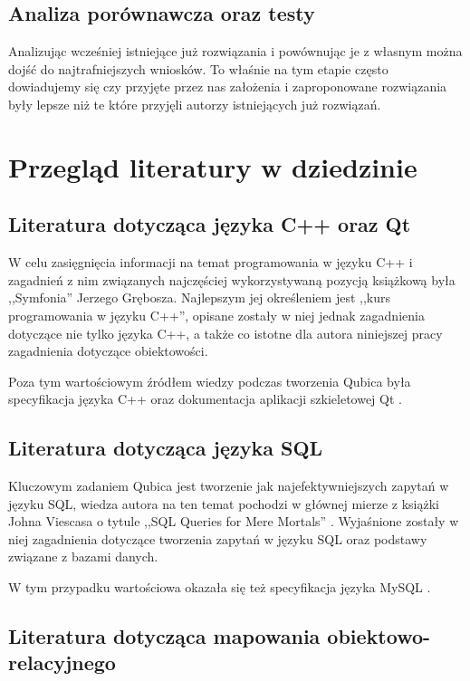 \documentclass[12pt]{report}
\begin{document}
\subsection{Analiza porównawcza oraz testy}

Analizując wcześniej istniejące już rozwiązania i powównując je z własnym można dojść do najtrafniejszych wniosków. To właśnie na tym etapie często dowiadujemy się czy
przyjęte przez nas założenia i zaproponowane rozwiązania były lepsze niż te które przyjęli autorzy istniejących już rozwiązań. 

\section{Przegląd literatury w dziedzinie}

\subsection{Literatura dotycząca języka C++ oraz Qt}

W celu zasięgnięcia informacji na temat programowania w języku C++ i zagadnień z nim związanych najczęściej wykorzystywaną pozycją książkową była ,,Symfonia'' 
\cite{symfonia} Jerzego Grębosza. Najlepszym jej określeniem jest ,,kurs programowania w języku C++'', opisane zostały w niej jednak zagadnienia dotyczące nie tylko języka 
C++, a także co istotne dla autora niniejszej pracy zagadnienia dotyczące obiektowości.

Poza tym wartościowym źródłem wiedzy podczas tworzenia Qubica była specyfikacja języka C++ \cite{cpp} oraz dokumentacja aplikacji szkieletowej Qt \cite{qt}.

\subsection{Literatura dotycząca języka SQL}

Kluczowym zadaniem Qubica jest tworzenie jak najefektywniejszych zapytań w języku SQL, wiedza autora na ten temat pochodzi w głównej mierze z książki Johna Viescasa o
tytule ,,SQL Queries for Mere Mortals'' \cite{sql}. Wyjaśnione zostały w niej zagadnienia dotyczące tworzenia zapytań w języku SQL oraz podstawy związane z bazami danych.

W tym przypadku wartościowa okazała się też specyfikacja języka MySQL \cite{mysql}.

\subsection{Literatura dotycząca mapowania obiektowo-relacyjnego}
\end{document}
